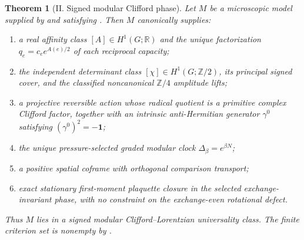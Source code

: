\documentclass[11pt]{article}
\newtheorem{theorem}{Theorem}[section]
\theoremstyle{definition}
\theoremstyle{remark}
\newcommand{\R}{\mathbb R}
\newcommand{\one}{\mathbf 1}
\newcommand{\Ztwo}{\mathbb Z/2}
\newcommand{\Zfour}{\mathbb Z/4}
\begin{document}
\begin{theorem}[II. Signed modular Clifford phase]
\label{thm:lorentzian-phase}
Let $M$ be a microscopic model supplied by
 and satisfying
.  Then $M$ canonically supplies:
\begin{enumerate}[label=\textup{(\roman*)},leftmargin=2.5em]
\item a real affinity class $[A]\in H^1(G;\R)$ and the unique factorization
      $q_e=c_e e^{A(e)/2}$ of each reciprocal capacity;
\item the independent determinant class $[\chi]\in H^1(G;\Ztwo)$, its principal
      signed cover, and the classified noncanonical $\Zfour$ amplitude lifts;
\item a projective reversible action whose radical quotient is a primitive
      complex Clifford factor, together with an intrinsic anti-Hermitian
      generator $\gamma^0$ satisfying $(\gamma^0)^2=-\one$;
\item the unique pressure-selected graded modular clock
      $\Delta_\beta=e^{\beta N}$;
\item a positive spatial coframe with orthogonal comparison transport;
\item exact stationary first-moment plaquette closure in the selected
      exchange-invariant phase, with no constraint on the exchange-even
      rotational defect.
\end{enumerate}
Thus $M$ lies in a signed modular Clifford--Lorentzian universality class.  The
finite criterion set is nonempty by
.
\end{theorem}
\end{document}
